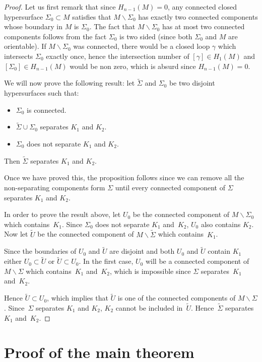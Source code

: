 \documentclass[10pt,a4paper]{amsart}
\numberwithin{equation}{section}
\begin{document}
\begin{proof}Let us first remark that since $H_{n-1}(M) = 0$, any connected
 closed hypersurface $\Sigma_0\subset M$ satisfies that
 $M\backslash\Sigma_0$ has exactly two connected components whose
 boundary in $M$ is $\Sigma_0$. The fact that $M\backslash\Sigma_0$ has at most two
 connected components follows from the fact $\Sigma_0$ is two sided
 (since both $\Sigma_0$ and $M$ are orientable). If
 $M\backslash\Sigma_0$ was connected, there would be a closed loop
 $\gamma$ which intersects $\Sigma_0$ exactly once, hence the
 intersection number of $[\gamma]\in H_1(M)$ and $[\Sigma_0]\in
 H_{n-1}(M)$ would be non zero, which is absurd since $H_{n-1}(M)=0$.

 We will now prove the following result: let $\tilde\Sigma$ and $\Sigma_0$ be two disjoint hypersurfaces such
 that:
\begin{itemize}\itemsep=0pt
\item $\Sigma_0$ is connected.
\item $\tilde\Sigma\cup\Sigma_0$ separates $K_1$ and $K_2$.
\item $\Sigma_0$ does not separate $K_1$ and $K_2$.
\end{itemize}
Then $\tilde\Sigma$ separates $K_1$ and $K_2$.

Once we have proved this, the proposition follows since we can remove
all the non-separating components form $\Sigma$ until every connected
component of $\Sigma$ separates $K_1$ and $K_2$.

In order to prove the result above, let $U_0$ be the connected
component of $M\backslash\Sigma_0$ which contains~$K_1$. Since
$\Sigma_0$ does not separate $K_1$ and~$K_2$, $U_0$ also contains
$K_2$. Now let $\tilde U$ be the connected component of
$M\backslash\tilde\Sigma$ which contains~$K_1$.

Since the boundaries of $U_0$ and $\tilde U$ are disjoint and both
$U_0$ and $\tilde U$ contain $K_1$ either
$U_0 \subset \tilde U$ or $\tilde U \subset U_0$. In the first case,
$U_0$ will be a connected component of $M\backslash\Sigma$ which
contains~$K_1$ and~$K_2$, which is impossible since $\Sigma$ separates~$K_1$ and~$K_2$.

Hence $\tilde U \subset U_0$, which implies that $\tilde U$ is one of
the connected components of $M\backslash\Sigma$. Since~$\Sigma$ separates
$K_1$ and $K_2$, $K_2$ cannot be included in~$\tilde U$. Hence~$\tilde\Sigma$ separates
$K_1$ and~$K_2$.
\end{proof}
\section{Proof of the main theorem}
\label{sec:proof}
\end{document}
